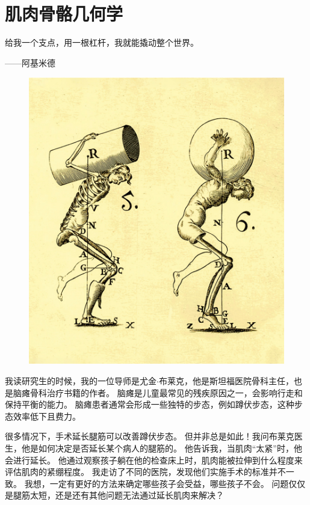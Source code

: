 \chapter{肌肉骨骼几何学} \label{chap:chap6}


给我一个支点，用一根杠杆，我就能撬动整个世界。

\begin{flushright}
	——阿基米德
\end{flushright}


\begin{figure}[!htb]
	\centering
	\includegraphics[width=1.0\linewidth]{chap6/6_0}
	\caption*{ \label{fig:6_0}}
\end{figure}


我读研究生的时候，我的一位导师是尤金$\cdot$布莱克，他是斯坦福医院骨科主任，也是脑瘫骨科治疗书籍的作者。
脑瘫是儿童最常见的残疾原因之一，会影响行走和保持平衡的能力。
脑瘫患者通常会形成一些独特的步态，例如蹲伏步态，这种步态效率低下且费力。


很多情况下，手术延长腿筋可以改善蹲伏步态。
但并非总是如此！我问布莱克医生，他是如何决定是否延长某个病人的腿筋的。
他告诉我，当肌肉“太紧”时，他会进行延长。
他通过观察孩子躺在他的检查床上时，肌肉能被拉伸到什么程度来评估肌肉的紧绷程度。
我走访了不同的医院，发现他们实施手术的标准并不一致。
我想，一定有更好的方法来确定哪些孩子会受益，哪些孩子不会。
问题仅仅是腿筋太短，还是还有其他问题无法通过延长肌肉来解决？


